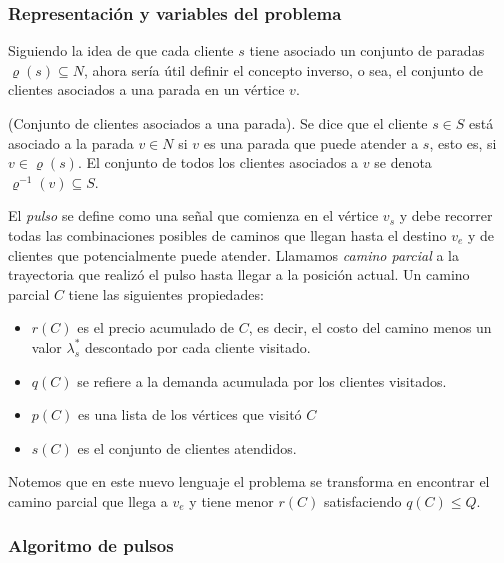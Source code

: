 \subsubsection{Representación y variables del problema}

Siguiendo la idea de que cada cliente $s$ tiene asociado un conjunto de paradas $\varrho(s) \subseteq N$, ahora sería útil definir el concepto inverso, o sea, el conjunto de clientes asociados a una parada en un vértice $v$.

\begin{definition}
    (Conjunto de clientes asociados a una parada).
    Se dice que el cliente $s \in S$ está asociado a la parada $v \in N$ si $v$ es una parada que puede atender a $s$, esto es, si $v \in \varrho(s)$. El conjunto de todos los clientes asociados a $v$ se denota $\varrho^{-1}(v) \subseteq S$.
\end{definition}

El \emph{pulso} se define como una señal que comienza en el vértice $v_s$ y debe recorrer todas las combinaciones posibles de caminos que llegan hasta el destino $v_e$ y de clientes que potencialmente puede atender. Llamamos \emph{camino parcial} a la trayectoria que realizó el pulso hasta llegar a la posición actual. Un camino parcial $C$ tiene las siguientes propiedades:

\begin{itemize}
    \item $r(C)$ es el precio acumulado de $C$, es decir, el costo del camino menos un valor $\lambda^{*}_s$ descontado por cada cliente visitado.
    \item $q(C)$ se refiere a la demanda acumulada por los clientes visitados.
    \item $p(C)$ es una lista de los vértices que visitó $C$
    \item $s(C)$ es el conjunto de clientes atendidos.
\end{itemize}

Notemos que en este nuevo lenguaje el problema se transforma en encontrar el camino parcial que llega a $v_e$ y tiene menor $r(C)$ satisfaciendo $q(C) \leq Q$.


\subsubsection{Algoritmo de pulsos}

